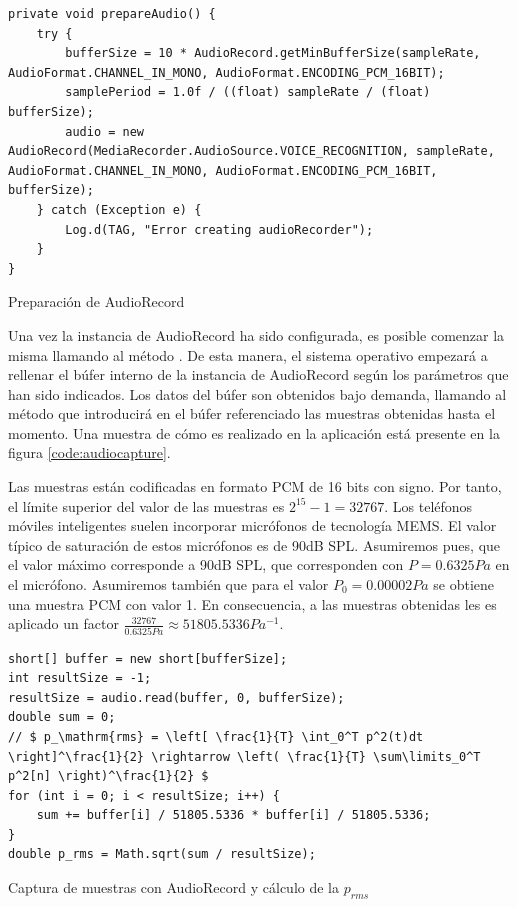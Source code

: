 \begin{listing}[h] 
\begin{verbatim}
private void prepareAudio() {
    try {
        bufferSize = 10 * AudioRecord.getMinBufferSize(sampleRate, AudioFormat.CHANNEL_IN_MONO, AudioFormat.ENCODING_PCM_16BIT);
        samplePeriod = 1.0f / ((float) sampleRate / (float) bufferSize);
        audio = new AudioRecord(MediaRecorder.AudioSource.VOICE_RECOGNITION, sampleRate, AudioFormat.CHANNEL_IN_MONO, AudioFormat.ENCODING_PCM_16BIT, bufferSize);
    } catch (Exception e) {
        Log.d(TAG, "Error creating audioRecorder");
    }
}
\end{verbatim}
\caption{Preparación de AudioRecord}
\label{code:audioprep}
\end{listing}

Una vez la instancia de AudioRecord ha sido configurada, es posible comenzar la misma llamando al método . De esta manera, el sistema operativo empezará a rellenar el búfer interno de la instancia de AudioRecord según los parámetros que han sido indicados. Los datos del búfer son obtenidos bajo demanda, llamando al método  que introducirá en el búfer referenciado las muestras obtenidas hasta el momento. Una muestra de cómo es realizado en la aplicación está presente en la figura \ref{code:audiocapture}. 

Las muestras están codificadas en formato \ac{PCM} de 16 bits con signo. Por tanto, el límite superior del valor de las muestras es $2^{15}-1=32767$. Los teléfonos móviles inteligentes suelen incorporar micrófonos de tecnología \ac{MEMS}. El valor típico de saturación de estos micrófonos es de 90dB SPL. Asumiremos pues, que el valor máximo  corresponde a 90dB SPL, que corresponden con $P=0.6325 Pa$ en el micrófono. Asumiremos también que para el valor $P_0=0.00002 Pa$ se obtiene una muestra PCM con valor 1.
En consecuencia, a las muestras obtenidas les es aplicado un factor $\frac{32767}{0.6325 Pa} \approx  51805.5336 Pa^{-1}$.

\begin{listing}[h] 
\begin{verbatim}
short[] buffer = new short[bufferSize];
int resultSize = -1;
resultSize = audio.read(buffer, 0, bufferSize);
double sum = 0;
// $ p_\mathrm{rms} = \left[ \frac{1}{T} \int_0^T p^2(t)dt \right]^\frac{1}{2} \rightarrow \left( \frac{1}{T} \sum\limits_0^T p^2[n] \right)^\frac{1}{2} $
for (int i = 0; i < resultSize; i++) {
    sum += buffer[i] / 51805.5336 * buffer[i] / 51805.5336;
}
double p_rms = Math.sqrt(sum / resultSize);
\end{verbatim}
\caption{Captura de muestras con AudioRecord y cálculo de la $p_{rms}$}
\label{code:audiocapture}
\end{listing}


